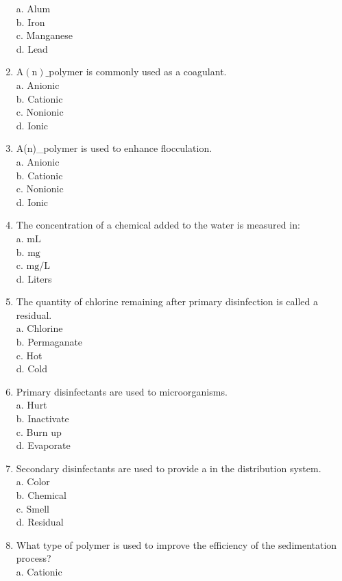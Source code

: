 \begin{enumerate}
a. Alum\\
b. Iron\\
c. Manganese\\
d. Lead\\
\item $\mathrm{A}(\mathrm{n}) \_$polymer is commonly used as a coagulant.\\
a. Anionic\\
b. Cationic\\
c. Nonionic\\
d. Ionic\\
\item A(n)\_polymer is used to enhance flocculation.\\
a. Anionic\\
b. Cationic\\
c. Nonionic\\
d. Ionic\\
\item The concentration of a chemical added to the water is measured in:\\
a. $\mathrm{mL}$\\
b. $\mathrm{mg}$\\
c. $\mathrm{mg} / \mathrm{L}$\\
d. Liters\\
\item The quantity of chlorine remaining after primary disinfection is called a residual.\\
a. Chlorine\\
b. Permaganate\\
c. Hot\\
d. Cold\\
\item Primary disinfectants are used to microorganisms.\\
a. Hurt\\
b. Inactivate\\
c. Burn up\\
d. Evaporate\\
\item Secondary disinfectants are used to provide a in the distribution system.\\
a. Color\\
b. Chemical\\
c. Smell\\
d. Residual\\
\item What type of polymer is used to improve the efficiency of the sedimentation process?\\
a. Cationic\\

\end{enumerate}
